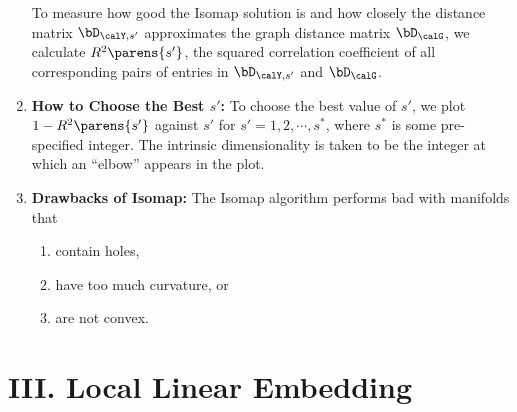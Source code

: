 \documentclass[12pt]{article}
\begin{document}
\begin{enumerate}[label=\textbf{\arabic*.}]
	To measure how good the Isomap solution is and how closely the distance matrix $\bD_{\calY, s'}$ approximates the graph distance matrix $\bD_{\calG}$, we calculate $R^2 \parens{s'}$, the squared correlation coefficient of all corresponding pairs of entries in $\bD_{\calY, s'}$ and $\bD_{\calG}$. 
	
	\item \textbf{How to Choose the Best $s'$:} To choose the best value of $s'$, we plot $1 - R^2 \parens{s'}$ against $s'$ for $s' = 1, 2, \cdots, s^*$, where $s^*$ is some pre-specified integer. The intrinsic dimensionality is taken to be the integer at which an ``elbow'' appears in the plot. 
	
	\item \textbf{Drawbacks of Isomap:} The Isomap algorithm performs bad with manifolds that 
	\begin{enumerate}
		\item contain holes, 
		\item have too much curvature, or 
		\item are not convex. 
	\end{enumerate}
	
\end{enumerate}


\section*{III. Local Linear Embedding}
\end{document}
